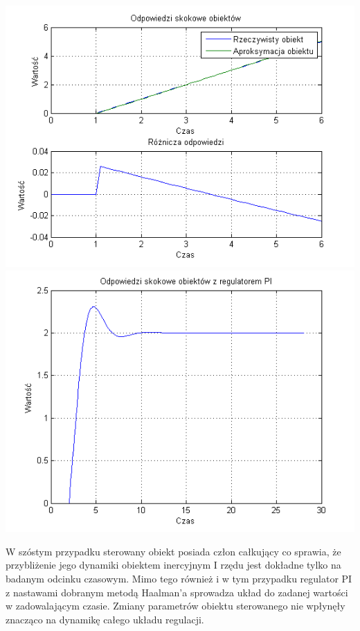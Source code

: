 \documentclass[10pt,a4paper]{article}
\begin{document}
\begin{center}
\includegraphics[scale=1]{images/jeden/skrypt_151.png}\\
\includegraphics[scale=1]{images/jeden/skrypt_152.png}\\
\end{center}
\newpage
W szóstym przypadku sterowany obiekt posiada człon całkujący co sprawia, że przybliżenie jego dynamiki obiektem inercyjnym I rzędu jest dokładne tylko na badanym odcinku czasowym. Mimo tego również i w tym przypadku regulator PI z nastawami dobranym metodą Haalman’a sprowadza układ do zadanej wartości w zadowalającym czasie. Zmiany parametrów obiektu sterowanego nie wpłynęły znacząco na dynamikę całego układu regulacji.
\newpage
\end{document}
